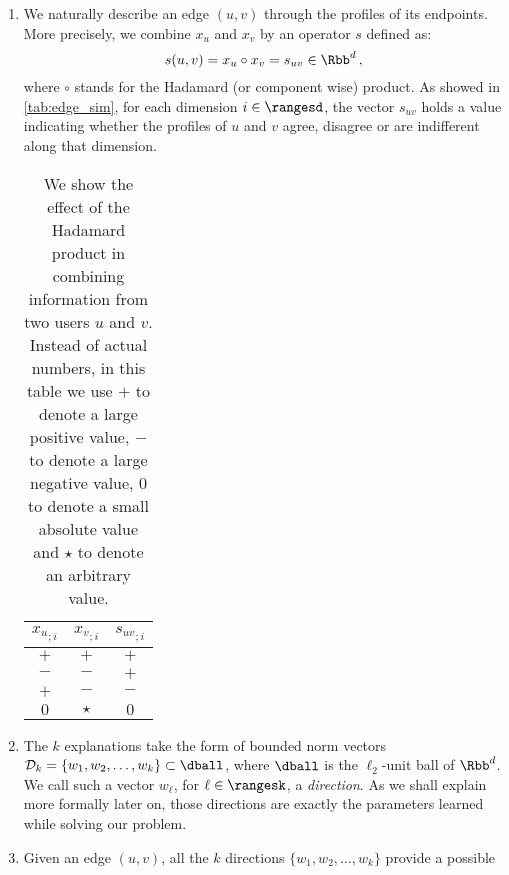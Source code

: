 \begin{enumerate}[1),nosep,leftmargin=*]
  \item We naturally describe an edge $(u,v)$ through the profiles of its endpoints. More precisely,
    we combine $x_u$ and $x_v$ by an operator $s$ defined as:
    \begin{equation*}
      s(u, v) = x_u \circ x_v = s_{uv} \in \Rbb^d \, ,
    \end{equation*}
    where $\circ$ stands for the Hadamard (or component wise) product. As showed in
    \autoref{tab:edge_sim}, for each dimension $i \in \rangesd$, the vector $s_{uv}$ holds a value
    indicating whether the profiles of $u$ and $v$ agree, disagree or are indifferent along that
    dimension.
    \begin{table}[hb]
      \centering
      \caption[Combining node profiles through the Hadamard product]{%
        \small We show the effect of the Hadamard product in combining information from two
        users $u$ and $v$. Instead of actual numbers, in this table we use $+$ to denote a large
        positive value, $-$ to denote a large negative value, $0$ to denote a small absolute value
        and $\star$ to denote an arbitrary value.
      \label{tab:edge_sim}}
      \begin{tabular}{ccc}
        \toprule
        ${x_u}_{;i}$ & ${x_v}_{;i}$ & ${s_{uv}}_{;i}$ \\
        \midrule
        $+$          & $+$          & $+$             \\
        $-$          & $-$          & $+$             \\
        $+$          & $-$          & $-$             \\
        $0$          & $\star$      & $0$             \\
        \bottomrule
      \end{tabular}
    \end{table}
  \item The $k$ explanations take the form of bounded norm vectors $\mathcal{D}_k = \{w_1, w_2,
    \ldots, w_k\} \subset \dball$, where $\dball$ is the $\ell_2$-unit ball of $\Rbb^d$. We call such a
    vector $w_\ell$, for $\ell \in \rangesk$, a \emph{direction}. As we shall explain more formally
    later on, those directions are exactly the parameters learned while solving our problem.
  \item Given an edge $(u,v)$, all the $k$ directions $\{w_1, w_2, \ldots, w_k\}$ provide a possible

\end{enumerate}
